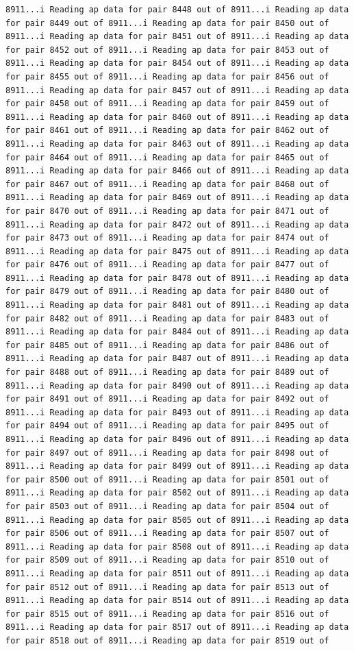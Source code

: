 \documentclass[
]{article}
\begin{document}
\begin{verbatim}
8911...i Reading ap data for pair 8448 out of 8911...i Reading ap data for pair 8449 out of 8911...i Reading ap data for pair 8450 out of 8911...i Reading ap data for pair 8451 out of 8911...i Reading ap data for pair 8452 out of 8911...i Reading ap data for pair 8453 out of 8911...i Reading ap data for pair 8454 out of 8911...i Reading ap data for pair 8455 out of 8911...i Reading ap data for pair 8456 out of 8911...i Reading ap data for pair 8457 out of 8911...i Reading ap data for pair 8458 out of 8911...i Reading ap data for pair 8459 out of 8911...i Reading ap data for pair 8460 out of 8911...i Reading ap data for pair 8461 out of 8911...i Reading ap data for pair 8462 out of 8911...i Reading ap data for pair 8463 out of 8911...i Reading ap data for pair 8464 out of 8911...i Reading ap data for pair 8465 out of 8911...i Reading ap data for pair 8466 out of 8911...i Reading ap data for pair 8467 out of 8911...i Reading ap data for pair 8468 out of 8911...i Reading ap data for pair 8469 out of 8911...i Reading ap data for pair 8470 out of 8911...i Reading ap data for pair 8471 out of 8911...i Reading ap data for pair 8472 out of 8911...i Reading ap data for pair 8473 out of 8911...i Reading ap data for pair 8474 out of 8911...i Reading ap data for pair 8475 out of 8911...i Reading ap data for pair 8476 out of 8911...i Reading ap data for pair 8477 out of 8911...i Reading ap data for pair 8478 out of 8911...i Reading ap data for pair 8479 out of 8911...i Reading ap data for pair 8480 out of 8911...i Reading ap data for pair 8481 out of 8911...i Reading ap data for pair 8482 out of 8911...i Reading ap data for pair 8483 out of 8911...i Reading ap data for pair 8484 out of 8911...i Reading ap data for pair 8485 out of 8911...i Reading ap data for pair 8486 out of 8911...i Reading ap data for pair 8487 out of 8911...i Reading ap data for pair 8488 out of 8911...i Reading ap data for pair 8489 out of 8911...i Reading ap data for pair 8490 out of 8911...i Reading ap data for pair 8491 out of 8911...i Reading ap data for pair 8492 out of 8911...i Reading ap data for pair 8493 out of 8911...i Reading ap data for pair 8494 out of 8911...i Reading ap data for pair 8495 out of 8911...i Reading ap data for pair 8496 out of 8911...i Reading ap data for pair 8497 out of 8911...i Reading ap data for pair 8498 out of 8911...i Reading ap data for pair 8499 out of 8911...i Reading ap data for pair 8500 out of 8911...i Reading ap data for pair 8501 out of 8911...i Reading ap data for pair 8502 out of 8911...i Reading ap data for pair 8503 out of 8911...i Reading ap data for pair 8504 out of 8911...i Reading ap data for pair 8505 out of 8911...i Reading ap data for pair 8506 out of 8911...i Reading ap data for pair 8507 out of 8911...i Reading ap data for pair 8508 out of 8911...i Reading ap data for pair 8509 out of 8911...i Reading ap data for pair 8510 out of 8911...i Reading ap data for pair 8511 out of 8911...i Reading ap data for pair 8512 out of 8911...i Reading ap data for pair 8513 out of 8911...i Reading ap data for pair 8514 out of 8911...i Reading ap data for pair 8515 out of 8911...i Reading ap data for pair 8516 out of 8911...i Reading ap data for pair 8517 out of 8911...i Reading ap data for pair 8518 out of 8911...i Reading ap data for pair 8519 out of 
\end{verbatim}
\end{document}
